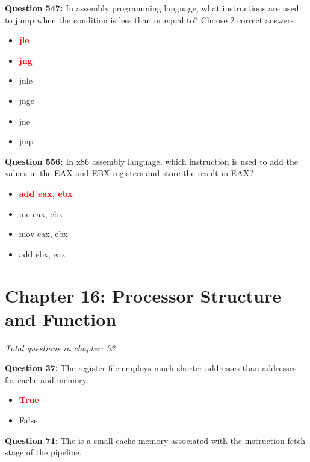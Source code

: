 \documentclass[12pt,a4paper]{article}
\begin{document}
\vspace{0.5cm}



\textbf{Question 547:} In assembly programming language, what instructions are used to jump when the condition is less than or equal to? Choose 2 correct answers

\begin{itemize}
    \item[\textbf{A.}] \textcolor{red}{\textbf{jle}}
    \item[\textbf{B.}] \textcolor{red}{\textbf{jng}}
    \item[\textbf{C.}] jnle
    \item[\textbf{D.}] jnge
    \item[\textbf{E.}] jne
    \item[\textbf{F.}] jmp
\end{itemize}

\textbf{Question 556:} In x86 assembly language, which instruction is used to add the values in the EAX and EBX registers and store the result in EAX?

\begin{itemize}
    \item[\textbf{A.}] \textcolor{red}{\textbf{add eax, ebx}}
    \item[\textbf{B.}] inc eax, ebx
    \item[\textbf{C.}] mov eax, ebx
    \item[\textbf{D.}] add ebx, eax
\end{itemize}

\section{Chapter 16: Processor Structure and Function}
\textit{Total questions in chapter: 53}

\textbf{Question 37:} The register file employs much shorter addresses than addresses for cache and memory.

\begin{itemize}
    \item[\textbf{A.}] \textcolor{red}{\textbf{True}}
    \item[\textbf{B.}] False
\end{itemize}

\vspace{0.5cm}

\vspace{0.5cm}

\textbf{Question 71:} The \underline{\hspace{1.5cm}} is a small cache memory associated with the instruction fetch stage of the pipeline.
\end{document}
